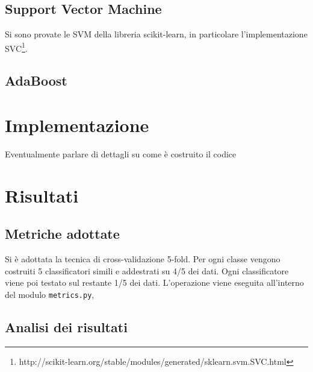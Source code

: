 \documentclass[12pt,a4paper,oneside,hidelinks]{report}
\begin{document}
\section{Support Vector Machine}
Si sono provate le SVM della libreria scikit-learn, in particolare l'implementazione SVC\footnote{http://scikit-learn.org/stable/modules/generated/sklearn.svm.SVC.html}.
\section{AdaBoost}

\chapter{Implementazione}
Eventualmente parlare di dettagli su come è costruito il codice
\chapter{Risultati}
\section{Metriche adottate}
Si è adottata la tecnica di cross-validazione 5-fold. Per ogni classe vengono costruiti 5 classificatori simili e addestrati su 4/5 dei dati. Ogni classificatore viene poi testato sul restante 1/5 dei dati.
L'operazione viene eseguita all'interno del modulo \texttt{metrics.py}, 
\section{Analisi dei risultati}
\end{document}
